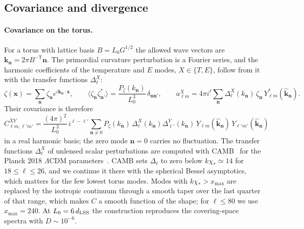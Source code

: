 \subsection{Covariance and divergence}
\label{rA:c-cov}

\paragraph{Covariance on the torus.}
For a torus with lattice basis $B=L_0G^{1/2}$ the allowed wave vectors are $\bm k_{\bm n}=2\pi B^{-\mathsf T}\bm n$.
The primordial curvature perturbation is a Fourier series, and the harmonic coefficients of the temperature and $E$ modes, $X\in\{T,E\}$, follow from it with the transfer functions $\Delta^X_\ell$:
\begin{equation}
\zeta(\bm x)=\sum_{\bm n}\zeta_{\bm n}e^{i\bm k_{\bm n}\cdot\bm x},\qquad \langle\zeta_{\bm n}\zeta^*_{\bm n'}\rangle=\frac{P_\zeta(k_{\bm n})}{L_0^3}\,\delta_{\bm n\bm n'},\qquad
a^X_{\ell m}=4\pi i^\ell\sum_{\bm n}\Delta^X_\ell(k_{\bm n})\,\zeta_{\bm n}\,Y^*_{\ell m}(\hat{\bm k}_{\bm n}).
\end{equation}
Their covariance is therefore~\cite{COMPACT:2023rkp}
\begin{equation}
C^{XY}_{\ell m,\ell'm'}=\frac{(4\pi)^2}{L_0^3}\,i^{\ell-\ell'}\sum_{\bm n\neq0}P_\zeta(k_{\bm n})\,\Delta^X_\ell(k_{\bm n})\Delta^Y_{\ell'}(k_{\bm n})\,Y_{\ell m}(\hat{\bm k}_{\bm n})\,Y_{\ell'm'}(\hat{\bm k}_{\bm n})
\label{eq:rA-cov}
\end{equation}
in a real harmonic basis; the zero mode $\bm n=0$ carries no fluctuation.
The transfer functions $\Delta^X_\ell$ of unlensed scalar perturbations are computed with CAMB~\cite{Lewis:1999bs} for the Planck 2018 $\Lambda$CDM parameters~\cite{Planck:2018vyg}.
CAMB sets $\Delta_\ell$ to zero below $k\chi_*\simeq14$ for $18\leq\ell\leq26$, and we continue it there with the spherical Bessel asymptotics, which matters for the few lowest torus modes. %
Modes with $k\chi_*>x_{\max}$ are replaced by the isotropic continuum through a smooth taper over the last quarter of that range, which makes $C$ a smooth function of the shape; for $\ell\leq80$ we use $x_{\max}=240$. %
At $L_0=6\,d_{\mathrm{LSS}}$ the construction reproduces the covering-space spectra with $D\sim10^{-6}$. %

